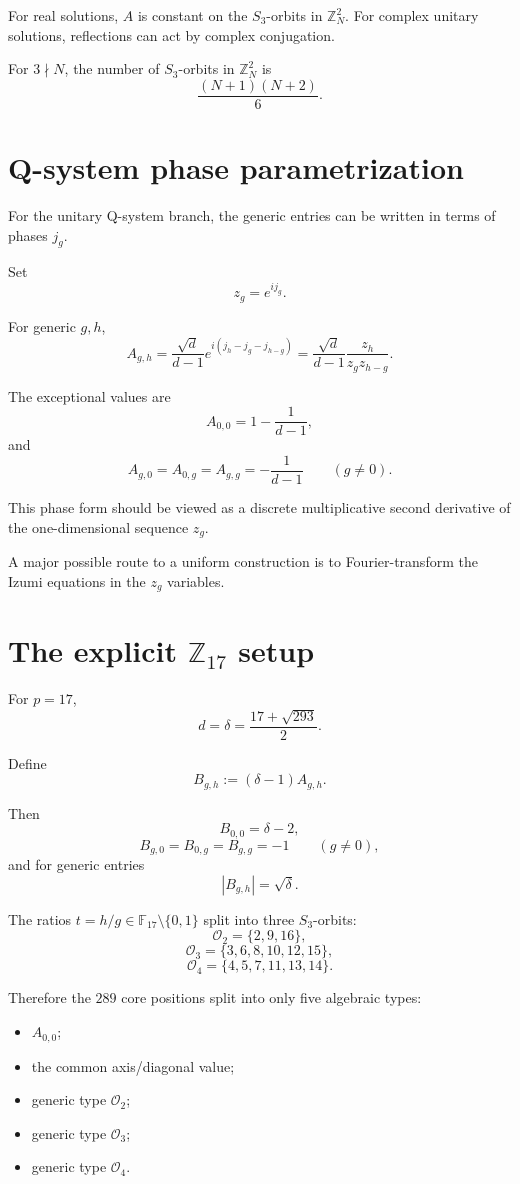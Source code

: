 \documentclass[11pt,reqno]{amsart}
\theoremstyle{plain}
\begin{document}
For real solutions, \(A\) is constant on the \(S_3\)-orbits in \(\mathbb Z_N^2\). For complex unitary solutions, reflections can act by complex conjugation.

For \(3\nmid N\), the number of \(S_3\)-orbits in \(\mathbb Z_N^2\) is
\[
\frac{(N+1)(N+2)}6.
\]

\section{Q-system phase parametrization}\label{sec:4}

For the unitary Q-system branch, the generic entries can be written in terms of phases \(j_g\).

Set
\[
z_g=e^{ij_g}.
\]

For generic \(g,h\),
\[
A_{g,h}
=
\frac{\sqrt d}{d-1}
e^{i(j_h-j_g-j_{h-g})}
=
\frac{\sqrt d}{d-1}
\frac{z_h}{z_gz_{h-g}}.
\]

The exceptional values are
\[
A_{0,0}=1-\frac1{d-1},
\]
and
\[
A_{g,0}=A_{0,g}=A_{g,g}
=
-\frac1{d-1}
\qquad (g\neq0).
\]

This phase form should be viewed as a discrete multiplicative second derivative of the one-dimensional sequence \(z_g\).

A major possible route to a uniform construction is to Fourier-transform the Izumi equations in the \(z_g\) variables.

\section{\texorpdfstring{The explicit \(\mathbb Z_{17}\) setup}{The explicit Z17 setup}}\label{sec:5}

For \(p=17\),
\[
d=\delta
=
\frac{17+\sqrt{293}}2.
\]

Define
\[
B_{g,h}:=(\delta-1)A_{g,h}.
\]

Then
\[
B_{0,0}=\delta-2,
\]
\[
B_{g,0}=B_{0,g}=B_{g,g}=-1
\qquad(g\neq0),
\]
and for generic entries
\[
|B_{g,h}|=\sqrt{\delta}.
\]

The ratios \(t=h/g\in\mathbb F_{17}\setminus\{0,1\}\) split into three \(S_3\)-orbits:
\[
\mathcal O_2=\{2,9,16\},
\]
\[
\mathcal O_3=\{3,6,8,10,12,15\},
\]
\[
\mathcal O_4=\{4,5,7,11,13,14\}.
\]

Therefore the \(289\) core positions split into only five algebraic types:

\begin{itemize}
\item \(A_{0,0}\);
\item the common axis/diagonal value;
\item generic type \(\mathcal O_2\);
\item generic type \(\mathcal O_3\);
\item generic type \(\mathcal O_4\).
\end{itemize}
\end{document}
